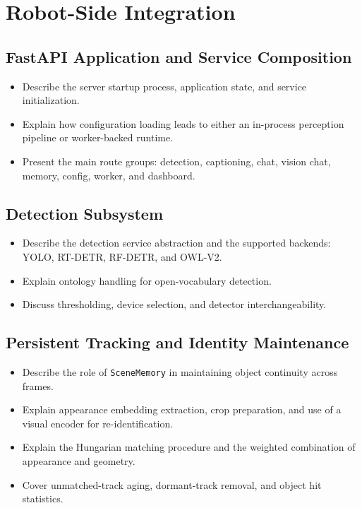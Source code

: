 
\chapter{Robot-Side Integration}\label{chap:robot_side}

\section{FastAPI Application and Service Composition}
\begin{itemize}
    \item Describe the server startup process, application state, and service initialization.
    \item Explain how configuration loading leads to either an in-process perception pipeline or worker-backed runtime.
    \item Present the main route groups: detection, captioning, chat, vision chat, memory, config, worker, and dashboard.
\end{itemize}

\section{Detection Subsystem}
\begin{itemize}
    \item Describe the detection service abstraction and the supported backends: YOLO, RT-DETR, RF-DETR, and OWL-V2.
    \item Explain ontology handling for open-vocabulary detection.
    \item Discuss thresholding, device selection, and detector interchangeability.
\end{itemize}

\section{Persistent Tracking and Identity Maintenance}
\begin{itemize}
    \item Describe the role of \texttt{SceneMemory} in maintaining object continuity across frames.
    \item Explain appearance embedding extraction, crop preparation, and use of a visual encoder for re-identification.
    \item Explain the Hungarian matching procedure and the weighted combination of appearance and geometry.
    \item Cover unmatched-track aging, dormant-track removal, and object hit statistics.
\end{itemize}


